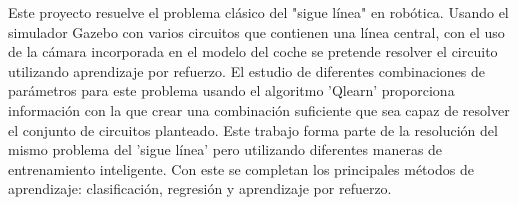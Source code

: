 Este proyecto resuelve el problema clásico del "sigue línea" en robótica. Usando el simulador Gazebo con varios circuitos que contienen una línea central, con el uso de la cámara incorporada en el modelo del coche se pretende resolver el circuito utilizando aprendizaje por refuerzo. El estudio de diferentes combinaciones de parámetros para este problema usando el algoritmo 'Qlearn' proporciona información con la que crear una combinación suficiente que sea capaz de resolver el conjunto de circuitos planteado. Este trabajo forma parte de la resolución del mismo problema del 'sigue línea' pero utilizando diferentes maneras de entrenamiento inteligente. Con este se completan los principales métodos de aprendizaje: clasificación, regresión y aprendizaje por refuerzo.